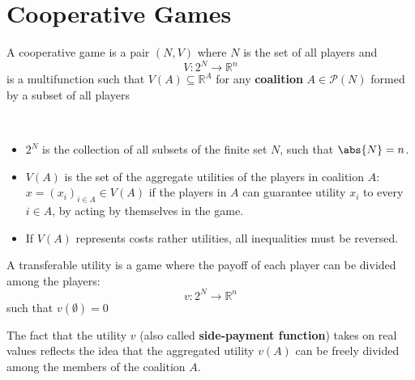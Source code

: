 \documentclass[../main.tex]{subfiles}
\begin{document}
\chapter{Cooperative Games}
\begin{definition}
    A cooperative game is a pair $(N,V)$ where $N$ is the set of all players and
    \[
        V : 2^N \to \mathbb{R}^n
    \]
    is a multifunction such that $V(A) \subseteq \mathbb{R}^A$ for any \textbf{coalition} $A \in \mathcal{P}(N)$ formed by a subset of all players
\end{definition}
\begin{note}\
    \begin{itemize}
        \item $2^N$ is the collection of all subsets of the finite set $N$, such that $\abs{N} = n$.
        \item $V(A)$ is the set of the aggregate utilities of the players in coalition $A$: $x = (x_i)_{i\in A} \in V(A)$ if the players in $A$ can guarantee utility $x_i$ to every $i \in A$, by acting by themselves in the game.
        \item If $V(A)$ represents costs rather utilities, all inequalities must be reversed.
    \end{itemize}
\end{note}
\begin{definition}
    A transferable utility is a game where the payoff of each player can be divided among the players:
    \[
        v: 2^N \to \mathbb{R}^n
    \]
    such that $v(\emptyset) = 0$
\end{definition}
The fact that the utility $v$ (also called \textbf{side-payment function}) takes on real values reflects the idea that the aggregated utility $v(A)$ can be freely divided among the members of the coalition $A$.
\end{document}
